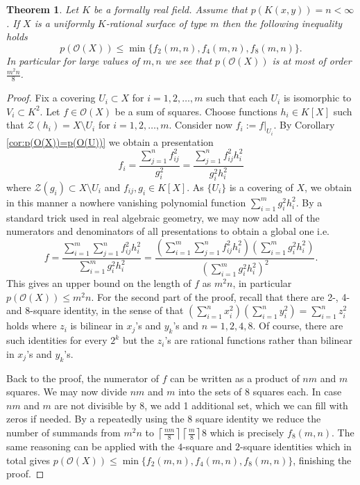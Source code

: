 \documentclass[12pt,reqno]{amsart}   	%
\newtheorem{thm}{Theorem}[section]
\theoremstyle{obs}
\theoremstyle{prob}
\theoremstyle{conj}
\theoremstyle{remark}
\newcommand{\OO}{\mathcal{O}}
\begin{document}
\begin{thm}
Let $K$ be a formally real field. Assume that $p(K(x,y))=n < \infty$. If $X$ is a uniformly $K$-rational surface of type $m$ then the following inequality holds
$$p(\OO(X)) \leq \min\{f_2(m,n),f_4(m,n),f_8(m,n) \}. $$
In particular for large values of $m,n$ we see that $p(\OO(X))$ is at most of order $\frac{m^2n}{8}$.
\end{thm}
\begin{proof}
Fix a covering $U_i \subset X$ for $i=1,2,\dots, m$ such that each $U_i$ is isomorphic to $V_i \subset K^2$. Let $f \in \OO(X)$ be a sum of squares. Choose functions $h_i \in K[X]$ such that $\mathcal{Z}(h_i)=X\setminus U_i$ for $i=1,2,\dots, m$. Consider now $f_i:=f|_{U_i}$. By Corollary \ref{cor:p(O(X))=p(O(U))} we obtain a presentation 
$$f_i=\frac{\sum_{j=1}^n f^2_{ij}}{g_i^2}=\frac{\sum_{j=1}^n f^2_{ij}h_i^2}{g_i^2h_i^2}$$
where $\mathcal{Z}(g_i) \subset X\setminus U_i$ and $f_{ij},g_i \in K[X]$. As $\{U_i\}$ is a covering of $X$, we obtain in this manner a nowhere vanishing polynomial function $\sum_{i=1}^mg_i^2h_i^2$. By a standard trick used in real algebraic geometry, we may now add all of the numerators and denominators of all presentations to obtain a global one i.e.
$$f=\frac{\sum_{i=1}^m \sum_{j=1}^n f^2_{ij}h_i^2}{\sum_{i=1}^mg_i^2h_i^2}=\frac{\left(\sum_{i=1}^m \sum_{j=1}^n f^2_{ij}h_i^2\right)\left(\sum_{i=1}^mg_i^2h_i^2\right)}{\left(\sum_{i=1}^mg_i^2h_i^2\right)^2}.$$
This gives an upper bound on the length of $f$ as $m^2n$, in particular $p(\OO(X)) \leq m^2n$.
For the second part of the proof, recall that there are 2-, 4- and 8-square identity, in the sense of that
$(\sum_{i=1}^n x_i^2)(\sum_{i=1}^n y_i^2)=\sum_{i=1}^n z_i^2$
holds where $z_i$ is bilinear in $x_j$'s and $y_k$'s and $n=1,2,4,8$. Of course, there are such identities for every $2^k$ but the $z_i$'s are rational functions rather than bilinear in $x_j$'s and $y_k$'s.




Back to the proof, the numerator of $f$ can be written as a product of $nm$ and $m$ squares. We may now divide $nm$ and $m$ into the sets of $8$ squares each. In case $nm$ and $m$ are not divisible by $8$, we add 1 additional set, which we can fill with zeros if needed. By a repeatedly using the $8$ square identity we reduce the number of summands from $m^2n$ to $ \left\lceil\frac{nm}{8} \right\rceil \left\lceil\frac{m}{8}\right\rceil8 $ which is precisely $f_8(m,n)$. The same reasoning can be applied with the $4$-square and $2$-square identities which in total gives $p(\OO(X)) \leq \min\{f_2(m,n),f_4(m,n),f_8(m,n) \}$, finishing the proof.


\end{proof}
\end{document}
